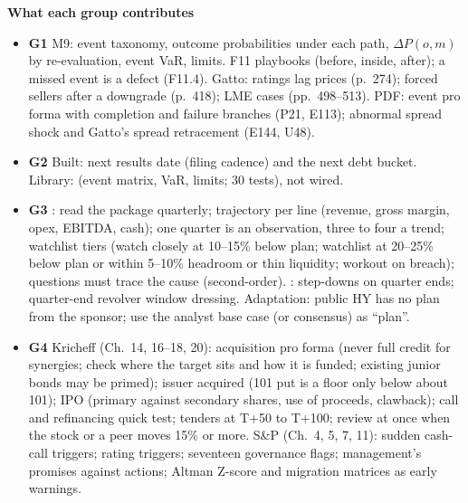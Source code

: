 \documentclass[11pt]{article}
\newcommand{\GA}{\textcolor{gA}{\textbf{G1}}}
\newcommand{\GB}{\textcolor{gB}{\textbf{G2}}}
\newcommand{\GC}{\textcolor{gC}{\textbf{G3}}}
\newcommand{\GD}{\textcolor{gD}{\textbf{G4}}}
\newcommand{\fld}[1]{\par\medskip\noindent\textbf{\textcolor{steel}{#1}}\par\nopagebreak}
\begin{document}
\fld{What each group contributes}
\begin{itemize}
\item \GA{} M9: event taxonomy, outcome probabilities under each path, $\Delta P(o,m)$ by re-evaluation, event VaR, limits. F11 playbooks (before, inside, after); a missed event is a defect (F11.4). Gatto: ratings lag prices (p.~274); forced sellers after a downgrade (p.~418); LME cases (pp.~498--513). PDF: event pro forma with completion and failure branches (P21, E113); abnormal spread shock and Gatto's spread retracement (E144, U48).
\item \GB{} Built: next results date (filing cadence) and the next debt bucket. Library:  (event matrix, VaR, limits; 30 tests), not wired.
\item \GC{} : read the package quarterly; trajectory per line (revenue, gross margin, opex, EBITDA, cash); one quarter is an observation, three to four a trend; watchlist tiers (watch closely at 10--15\% below plan; watchlist at 20--25\% below plan or within 5--10\% headroom or thin liquidity; workout on breach); questions must trace the cause (second-order). : step-downs on quarter ends; quarter-end revolver window dressing. Adaptation: public HY has no plan from the sponsor; use the analyst base case (or consensus) as ``plan''.
\item \GD{} Kricheff (Ch.~14, 16--18, 20): acquisition pro forma (never full credit for synergies; check where the target sits and how it is funded; existing junior bonds may be primed); issuer acquired (101 put is a floor only below about 101); IPO (primary against secondary shares, use of proceeds, clawback); call and refinancing quick test; tenders at T+50 to T+100; review at once when the stock or a peer moves 15\% or more. S\&P (Ch.~4, 5, 7, 11): sudden cash-call triggers; rating triggers; seventeen governance flags; management's promises against actions; Altman Z-score and migration matrices as early warnings.
\end{itemize}
\end{document}
